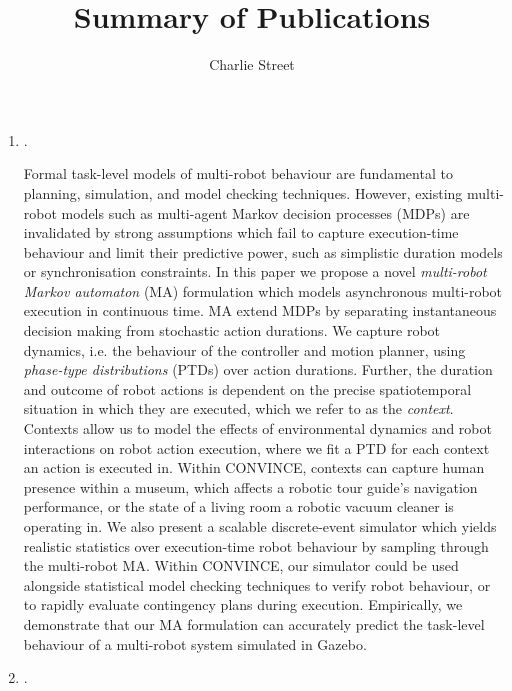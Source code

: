 \documentclass[12pt]{article}
\title{\vspace{-60pt}Summary of Publications}
\date{}
\author{Charlie Street}
\begin{document}
\maketitle
\thispagestyle{empty}
\begin{enumerate}
\item[\cite{street2022context}] .


Formal task-level models of multi-robot behaviour are fundamental to planning, simulation, and model checking techniques.
%
However, existing multi-robot models such as multi-agent Markov decision processes (MDPs) are invalidated by strong assumptions which fail to capture execution-time behaviour and limit their predictive power, such as simplistic duration models or synchronisation constraints.
%
In this paper we propose a novel \emph{multi-robot Markov automaton} (MA) formulation which models asynchronous multi-robot execution in continuous time.
%
MA extend MDPs by separating instantaneous decision making from stochastic action durations.
%
We capture robot dynamics, i.e. the behaviour of the controller and motion planner, using \emph{phase-type distributions} (PTDs) over action durations.
%
Further, the duration and outcome of robot actions is dependent on the precise spatiotemporal situation in which they are executed, which we refer to as the \emph{context}.
%
Contexts allow us to model the effects of environmental dynamics and robot interactions on robot action execution, where we fit a PTD for each context an action is executed in.
%
Within CONVINCE, contexts can capture human presence within a museum, which affects a robotic tour guide's navigation performance, or the state of a living room a robotic vacuum cleaner is operating in.
%
We also present a scalable discrete-event simulator which yields realistic statistics over execution-time robot behaviour by sampling through the multi-robot MA.
%
Within CONVINCE, our simulator could be used alongside statistical model checking techniques to verify robot behaviour, or to rapidly evaluate contingency plans during execution.
%
Empirically, we demonstrate that our MA formulation can accurately predict the task-level behaviour of a multi-robot system simulated in Gazebo.

\item[\cite{street2020multi}] .


\end{enumerate}
\end{document}
